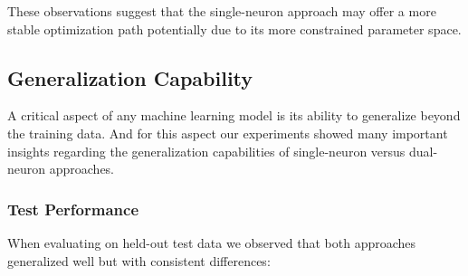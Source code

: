 These observations suggest that the single-neuron approach may offer a more stable optimization path potentially due to its more constrained parameter space.

\subsection{Generalization Capability}

A critical aspect of any machine learning model is its ability to generalize beyond the training data. And for this aspect our experiments showed many important insights regarding the generalization capabilities of single-neuron versus dual-neuron approaches.

\subsubsection{Test Performance}

When evaluating on held-out test data we observed that both approaches generalized well but with consistent differences:

